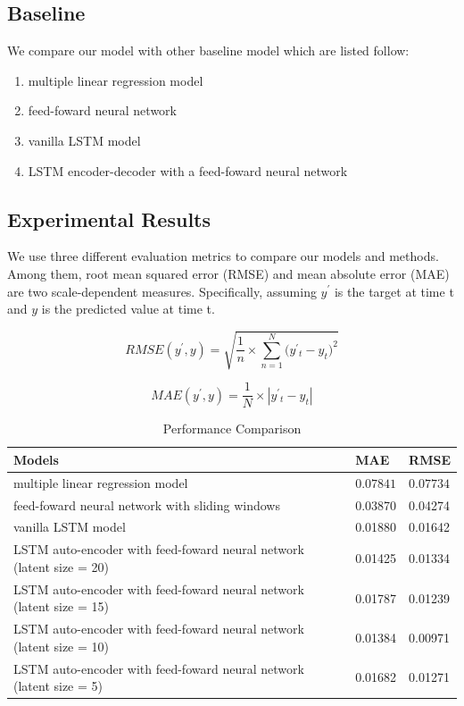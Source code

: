 \documentclass[5p]{elsarticle}
\begin{document}
\subsection{Baseline}
We compare our model with other baseline model which are listed follow:
\begin{enumerate}
  \item multiple linear regression model
  \item feed-foward neural network
  \item vanilla LSTM model
  \item LSTM encoder-decoder with a feed-foward neural network
\end{enumerate}

\subsection{Experimental Results}

We use three different evaluation metrics to compare our models and methods. Among them, root mean squared error (RMSE) and mean absolute error (MAE) are two scale-dependent measures. Specifically, assuming $y^'$ is the target at time t and $y$ is the predicted value at time t. 


\begin{equation}
    RMSE(y^{'},y)=\sqrt{\frac{1}{n}\times{\sum_{n=1}^N(y^{'}{_t}-y_t})^2}
\end{equation}

\begin{equation}
	 MAE(y^{'},y)=\frac{1}{N}\times\left| y^{'}{_t}-y_t \right|
\end{equation}


\begin{table}[]
\centering
\caption{Performance Comparison}
\label{my-label}
\begin{tabular}{|l|l|l|}
\hline
Models & MAE  & RMSE\\
\hline
multiple linear regression model 
& $0.07841$   & $0.07734$ \\
\hline
feed-foward neural network with sliding windows 
& 0.03870  & 0.04274 \\
\hline
vanilla LSTM model
& 0.01880  & 0.01642 \\
\hline
LSTM auto-encoder with feed-foward neural network (latent size = 20)& 
0.01425 &  0.01334 \\
\hline
LSTM auto-encoder with feed-foward neural network (latent size = 15)& 
0.01787 &  0.01239 \\
\hline
LSTM auto-encoder with feed-foward neural network (latent size = 10)& 
0.01384 &  0.00971 \\
\hline
LSTM auto-encoder with feed-foward neural network (latent size = 5)& 
0.01682 & 0.01271 \\
\hline    
\end{tabular}
\end{table}
\end{document}
